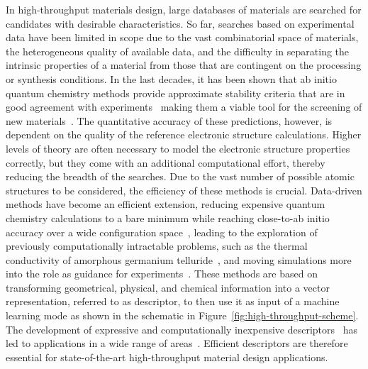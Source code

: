 In high-throughput materials design, large databases of materials are searched for candidates with desirable characteristics.
So far, searches based on experimental data have been limited in scope due to the vast combinatorial space of materials, the heterogeneous quality of available data, and the difficulty in separating the intrinsic properties of a material from those that are contingent on the processing or synthesis conditions.
In the last decades, it has been shown that ab initio quantum chemistry methods provide approximate stability criteria that are in good agreement with experiments~\cite{jansen2015conceptual} making them a viable tool for the screening of new materials~\cite{ceder1998identification, andersson2006toward, yang2012search, gomez2016design}.
The quantitative accuracy of these predictions, however, is dependent on the quality of the reference electronic structure calculations. 
Higher levels of theory are often necessary to model the electronic structure properties correctly, but they come with an additional computational effort, thereby reducing the breadth of the searches.
Due to the vast number of possible atomic structures to be considered, the efficiency of these methods is crucial.
Data-driven methods have become an efficient extension, reducing expensive quantum chemistry calculations to a bare minimum while reaching close-to-ab initio accuracy over a wide configuration space~\cite{bartok2018machine}, leading to the exploration of previously computationally intractable problems, such as the thermal conductivity of amorphous germanium telluride~\cite{sosso2012thermal}, and moving simulations more into the role as guidance for experiments~\cite{chang_simulations_2023}.
These methods are based on transforming geometrical, physical, and chemical information into a vector representation, referred to as descriptor, to then use it as input of a machine learning mode as shown in the schematic in Figure~\ref{fig:high-throughput-scheme}.
The development of expressive and computationally inexpensive descriptors~\cite{kabylda2023efficient, doi:10.1021/acs.chemrev.0c01111} has led to applications in a wide range of areas~\cite{mansouri2018machine, sosso2018understanding, basdogan2019machine}.
Efficient descriptors are therefore essential for state-of-the-art high-throughput material design applications.
